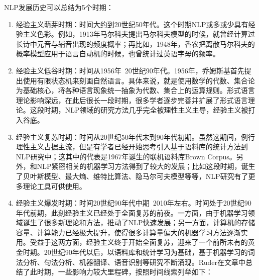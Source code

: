 NLP发展历史可以总结为5个时期：
\begin{enumerate}
\item 经验主义萌芽时期：时间大约到20世纪50年代。这个时期NLP或多或少具有经验主义色彩。例如，1913年马尔科夫提出马尔科夫模型\cite{markov1913example}的时候，就曾经计算过长诗中元音与辅音出现的频度概率；再比如，1948年，香农把离散马尔科夫的概率模型应用于语言自动机\cite{shannon1948mathematical}的时候，也曾统计过英语字母的频率。

\item 经验主义低谷时期：时间从1956年~20世纪90年代。1956年，乔姆斯基首先提出使用有限状态机来刻画自然语言\cite{chomsky1956three}。具体来说，就是使用数学的代数、集合论为基础核心，将各种语言现象统一抽象为代数、集合上的运算规则。形式语言理论影响深远，在此后很长一段时期，很多学者逐步完善并扩展了形式语言理论。这段时期，NLP领域的研究方法几乎完全被理性主义主导，经验主义被打入谷底。

\item 经验主义复苏时期：时间从20世纪50年代末到90年代初期。虽然这期间，例行理性主义占据主流，但是有学者已经开始思考引入基于语料库的统计方法到NLP研究中；这其中的代表是1967年诞生的联机语料库Brown Corpus\cite{kuvcera1967computational}。另外，和NLP紧密相关的机器学习方法得到了较大的发展；比如这段时期，诞生了贝叶斯模型、最大熵\cite{jaynes1957information}、维特比算法\cite{viterbi1967error}、隐马尔可夫模型\cite{stratonovich1965conditional}等等，NLP研究有了更多理论工具可供使用。

\item 经验主义爆发时期：时间20世纪90年代中期~2010年左右。时间处于20世纪90年代前期，此刻经验主义已经处于全面复苏的前夜。一方面，由于机器学习领域诞生了很多新理论和方法，推动了NLP快速发展；另一方面，计算机的存储容量、计算能力已经极大提升，使得很多计算量偏大的机器学习方法逐渐实用。受益于这两方面，经验主义终于开始全面复苏，迎来了一个前所未有的黄金时期。20世纪90年代以后，以语料库和统计学习为基础，基于机器学习的词法分析、句法分析、机器翻译、语音识别等研究不断涌现。Ruder\cite{ruder2018review}在文章中总结了此时期，一些影响力较大里程碑，按照时间线索列举如下：


\end{enumerate}
